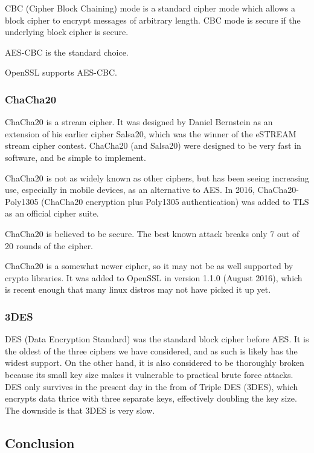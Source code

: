 \documentclass[onecolumn, draftclsnofoot,10pt, compsoc]{IEEEtran}
\begin{document}
CBC (Cipher Block Chaining) mode is a standard cipher mode which allows a block cipher to encrypt messages of arbitrary length. CBC mode is secure if the underlying block cipher is secure.

AES-CBC is the standard choice.

OpenSSL supports AES-CBC.

\subsubsection{ ChaCha20 }

ChaCha20 \cite{chacha} is a stream cipher. It was designed by Daniel Bernstein as an extension of his earlier cipher Salsa20, which was the winner of the eSTREAM stream cipher contest.
ChaCha20 (and Salsa20) were designed to be very fast in software, and be simple to implement.

ChaCha20 is not as widely known as other ciphers, but has been seeing increasing use, especially in mobile devices, as an alternative to AES. In 2016, ChaCha20-Poly1305 (ChaCha20 encryption plus Poly1305 authentication) was added to TLS as an official cipher suite. \cite{rfc7905}


ChaCha20 is believed to be secure. The best known attack breaks only 7 out of 20 rounds of the cipher. %

ChaCha20 is a somewhat newer cipher, so it may not be as well supported by crypto libraries. It was added to OpenSSL in version 1.1.0 (August 2016), which is recent enough that many linux distros may not have picked it up yet.

\subsubsection{ 3DES }

DES (Data Encryption Standard) was the standard block cipher before AES. It is the oldest of the three ciphers we have considered, and as such is likely has the widest support. On the other hand, it is also considered to be thoroughly broken because its small key size makes it vulnerable to practical brute force attacks. DES only survives in the present day in the from of Triple DES (3DES), which encrypts data thrice with three separate keys, effectively doubling the key size. The downside is that 3DES is very slow.

\subsection{ Conclusion }
\end{document}
